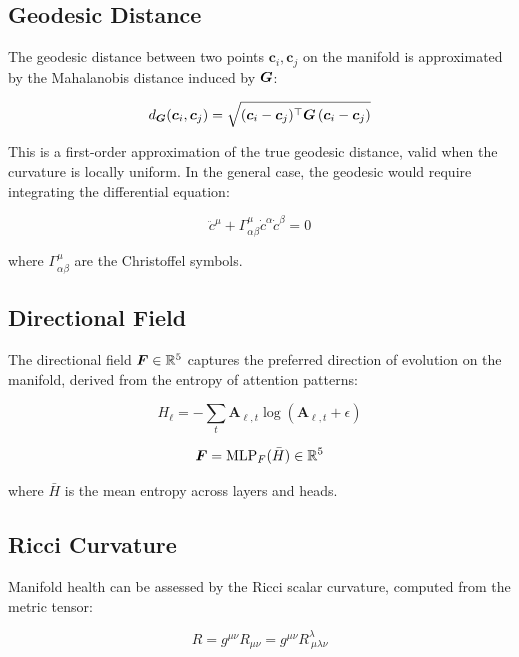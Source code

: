 \subsection{Geodesic Distance}

The geodesic distance between two points $\bm{c}_i, \bm{c}_j$ on the
manifold is approximated by the Mahalanobis distance induced by $\bm{G}$:

\begin{equation}
    d_{\bm{G}}(\bm{c}_i, \bm{c}_j) = \sqrt{(\bm{c}_i - \bm{c}_j)^\top \bm{G}\, (\bm{c}_i - \bm{c}_j)}
    \label{eq:geodesic}
\end{equation}

This is a first-order approximation of the true geodesic distance, valid
when the curvature is locally uniform. In the general case, the geodesic
would require integrating the differential equation:

\begin{equation}
    \ddot{c}^\mu + \Gamma^\mu_{\alpha\beta} \dot{c}^\alpha \dot{c}^\beta = 0
\end{equation}

where $\Gamma^\mu_{\alpha\beta}$ are the Christoffel symbols.

\subsection{Directional Field}

The directional field $\bm{F} \in \mathbb{R}^5$ captures the preferred direction
of evolution on the manifold, derived from the entropy of attention
patterns:

\begin{equation}
    H_\ell = -\sum_t \bm{A}_{\ell,t} \log(\bm{A}_{\ell,t} + \epsilon)
\end{equation}

\begin{equation}
    \bm{F} = \text{MLP}_F(\bar{H}) \in \mathbb{R}^5
\end{equation}

where $\bar{H}$ is the mean entropy across layers and heads.

\subsection{Ricci Curvature}

Manifold health can be assessed by the Ricci scalar curvature, computed
from the metric tensor:

\begin{equation}
    R = g^{\mu\nu} R_{\mu\nu} = g^{\mu\nu} R^\lambda_{\ \mu\lambda\nu}
\end{equation}

